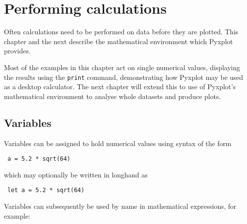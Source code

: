 %
%
%
%
%



\chapter{Performing calculations}

Often calculations need to be performed on data before they are plotted. This
chapter and the next describe the mathematical environment which Pyxplot
provides.

Most of the examples in this chapter act on single numerical values, displaying
the results using the {\tt print} command, demonstrating how Pyxplot may be
used as a desktop calculator. The next chapter will extend this to use of
Pyxplot's mathematical environment to analyse whole datasets and produce plots.

\section{Variables}

Variables can be assigned to hold numerical values using syntax of the form

\begin{verbatim} a = 5.2 * sqrt(64) \end{verbatim}

\noindent which may optionally be written in longhand as

\begin{verbatim} let a = 5.2 * sqrt(64) \end{verbatim}

\noindent Variables can subsequently be used by name in mathematical
expressions, for example:

